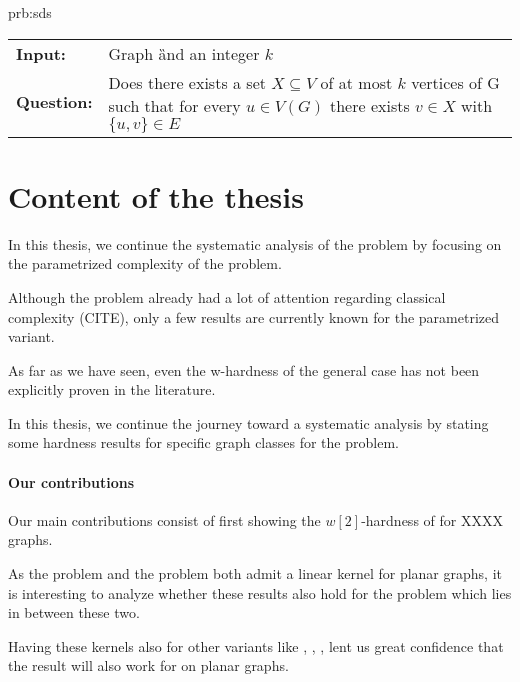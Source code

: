 \begin{prb}{prb:sds}
    
    \begin{tabularx}{0.8\textwidth}{>{\hsize=0.35\hsize}X>{\hsize=0.8\hsize}X}
        \textbf{Input:} & Graph \G and an integer $k$\\
        \textbf{Question:} & Does there exists a set $X \subseteq V$ of at most $k$ vertices of G such that for every $u \in V(G)$ there exists $v \in X$ with $\{u,v\} \in E$ \\
    \end{tabularx}
        
\end{prb}



\section{Content of the thesis}

In this thesis, we continue the systematic analysis of the \sdom problem by focusing on the parametrized complexity of the problem. 

Although the problem already had a lot of attention regarding classical complexity (CITE), only a few results are currently known for the parametrized variant. 

As far as we have seen, even the w-hardness of the general case has not been explicitly proven in the literature. 

In this thesis, we continue the journey toward a systematic analysis by stating some hardness results for specific graph classes for the problem.

\paragraph{Our contributions}

Our main contributions consist of first showing the $w[2]$-hardness of \sdom for XXXX graphs.

\noindent As the \dom problem and the \tdom problem both admit a linear kernel for planar graphs, it is interesting to analyze whether these results also hold for the \sdom problem which lies in between these two. 

Having these kernels also for other variants like \eddom, \efdom, \cdom, \rbdom lent us great confidence that the result will also work for \sdom on planar graphs.


